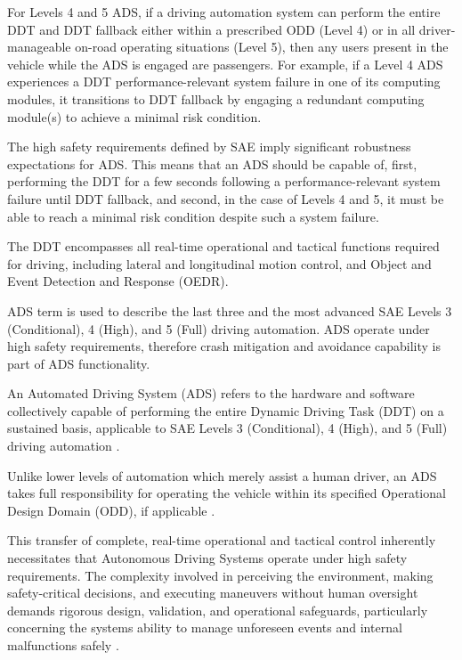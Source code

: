 For Levels 4 and 5 ADS, if a driving automation system can perform the entire DDT and DDT fallback either within a prescribed ODD (Level 4) or in all driver-manageable on-road operating situations (Level 5), then any users present in the vehicle while the ADS is engaged are passengers. For example, if a Level 4 ADS experiences a DDT performance-relevant system failure in one of its computing modules, it transitions to DDT fallback by engaging a redundant computing module(s) to achieve a minimal risk condition.

The high safety requirements defined by SAE imply significant robustness expectations for ADS. This means that an ADS should be capable of, first, performing the DDT for a few seconds following a performance-relevant system failure until DDT fallback, and second, in the case of Levels 4 and 5, it must be able to reach a minimal risk condition despite such a system failure\cite{sae:j3016:2021apr}.


The DDT encompasses all real-time operational and tactical functions required for driving, including lateral and longitudinal motion control, and Object and Event Detection and Response (OEDR).




ADS term is used to describe the last three and the most advanced SAE Levels 3 (Conditional), 4 (High), and 5 (Full) driving automation. ADS operate under high safety requirements, therefore crash mitigation and avoidance capability is part of ADS functionality.

An Automated Driving System (ADS) refers to the hardware and software
collectively capable of performing the entire Dynamic Driving Task (DDT)
on a sustained basis, applicable to SAE Levels 3 (Conditional), 4
(High), and 5 (Full) driving automation{ \textsuperscript{} }.

Unlike
lower levels of automation which merely assist a human driver, an ADS
takes full responsibility for operating the vehicle within its specified
Operational Design Domain (ODD), if applicable{ \textsuperscript{} }.

This transfer of complete, real-time operational and tactical control {
\textsuperscript{} } inherently necessitates that Autonomous Driving
Systems operate under high safety requirements. The complexity involved
in perceiving the environment, making safety-critical decisions, and
executing maneuvers without human oversight demands rigorous design,
validation, and operational safeguards, particularly concerning the
system\textquotesingle s ability to manage unforeseen events and
internal malfunctions safely{ \textsuperscript{} }. { ~ }

